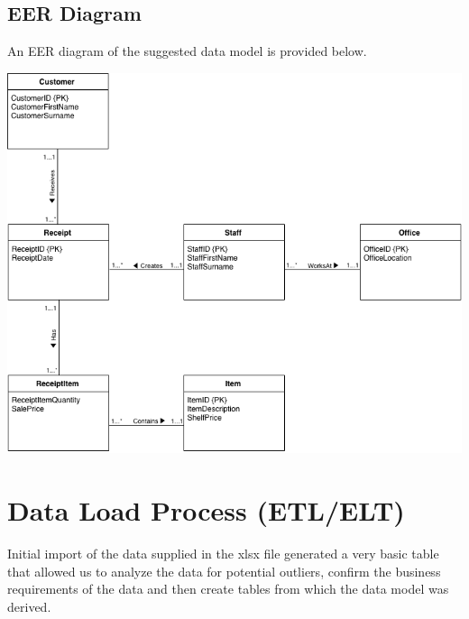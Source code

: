 \documentclass{article}
\begin{document}
        \subsection{EER Diagram}
            An EER diagram of the suggested data model is provided below. 

            \bigskip

            \begin{center}
                \includegraphics[width=\textwidth-40pt,keepaspectratio]{Images/A2-EERModel.png}
            \end{center}


\newpage

    \section{Data Load Process (ETL/ELT)}
    \label{sec:ETL}
        Initial import of the data supplied in the xlsx file generated a very basic table
        that allowed us to analyze the data for potential outliers, confirm the business
        requirements of the data and then create tables from which the data model was derived.
        \\
        
\end{document}
